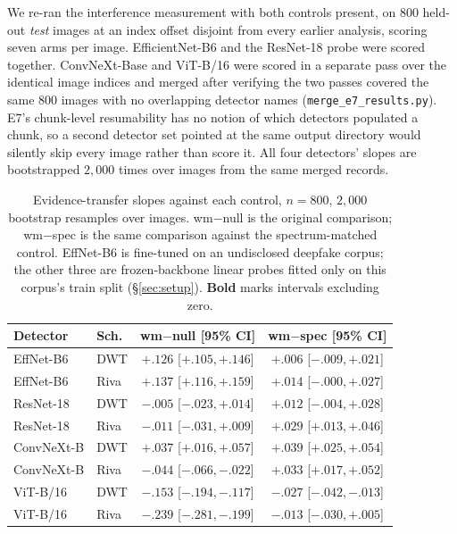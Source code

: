 \documentclass[journal]{IEEEtran}
\begin{document}
We re-ran the interference measurement with both controls present, on $800$
held-out \emph{test} images at an index offset disjoint from every earlier
analysis, scoring seven arms per image. EfficientNet-B6 and the ResNet-18
probe were scored together. ConvNeXt-Base and ViT-B/16 were scored in a
separate pass over the identical image indices and merged after verifying the
two passes covered the same $800$ images with no overlapping detector names
(\texttt{merge\_e7\_results.py}). E7's chunk-level resumability has no notion
of which detectors populated a chunk, so a second detector set pointed at the
same output directory would silently skip every image rather than score it.
All four detectors' slopes are bootstrapped $2{,}000$ times over images from
the same merged records.

\begin{table}[t]
\centering
\caption{Evidence-transfer slopes against each control, $n=800$, $2{,}000$
bootstrap resamples over images. wm$-$null is the original comparison;
wm$-$spec is the same comparison against the spectrum-matched control.
EffNet-B6 is fine-tuned on an undisclosed deepfake corpus; the other three
are frozen-backbone linear probes fitted only on this corpus's train split
(\S\ref{sec:setup}). \textbf{Bold} marks intervals excluding zero.}
\label{tab:control-hierarchy}
\footnotesize
\setlength{\tabcolsep}{2.5pt}
\begin{tabular}{llcc}
\toprule
Detector & Sch. & wm$-$null [95\% CI] & wm$-$spec [95\% CI] \\
\midrule
EffNet-B6 & DWT & $\mathbf{+.126}$ [$+.105,+.146$] & $+.006$ [$-.009,+.021$] \\
EffNet-B6 & Riva & $\mathbf{+.137}$ [$+.116,+.159$] & $+.014$ [$-.000,+.027$] \\
ResNet-18 & DWT & $-.005$ [$-.023,+.014$] & $+.012$ [$-.004,+.028$] \\
ResNet-18 & Riva & $-.011$ [$-.031,+.009$] & $\mathbf{+.029}$ [$+.013,+.046$] \\
ConvNeXt-B & DWT & $\mathbf{+.037}$ [$+.016,+.057$] & $\mathbf{+.039}$ [$+.025,+.054$] \\
ConvNeXt-B & Riva & $\mathbf{-.044}$ [$-.066,-.022$] & $\mathbf{+.033}$ [$+.017,+.052$] \\
ViT-B/16 & DWT & $\mathbf{-.153}$ [$-.194,-.117$] & $\mathbf{-.027}$ [$-.042,-.013$] \\
ViT-B/16 & Riva & $\mathbf{-.239}$ [$-.281,-.199$] & $-.013$ [$-.030,+.005$] \\
\bottomrule
\end{tabular}
\end{table}
\end{document}
